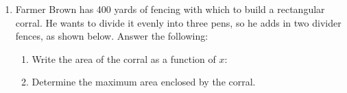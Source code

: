 \begin{enumerate}
\item Farmer Brown has 400 yards of fencing with which to build a
  rectangular corral. He wants to divide it evenly into three pens, so
  he adds in two divider fences, as shown below. Answer the following:


\begin{enumerate}
\item Write the area of the corral as a function of $x$: 
\item Determine the maximum area enclosed by the corral.
\end{enumerate}

\vfill

  
\end{enumerate}
